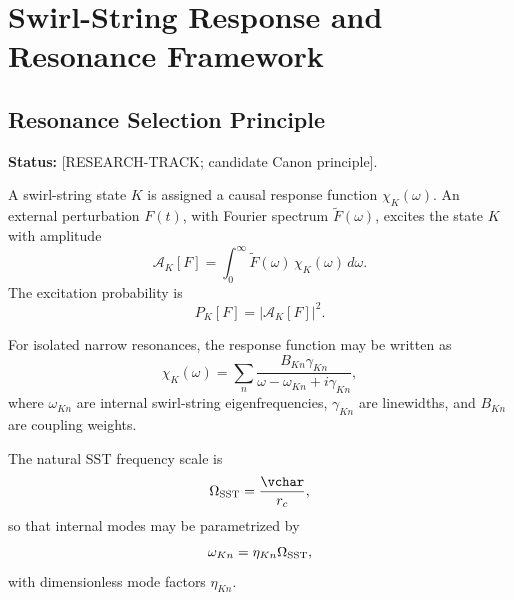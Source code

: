 \providecommand{\vswirl}{\mathbf{v}_{\!\boldsymbol{\circlearrowleft}}}
\providecommand{\vnorm}{\lVert \mathbf{v}_{\!\boldsymbol{\circlearrowleft}}\rVert}
\providecommand{\rhoF}{\rho_{\!f}}
\providecommand{\rhoE}{\rho_{\!E}}
\providecommand{\rhoM}{\rho_{\!m}}
\providecommand{\rhocore}{\rho_{\text{core}}}
\providecommand{\rc}{r_c}
\providecommand{\omC}{\omega_C}
\providecommand{\Fswirlmax}{F_{\text{swirl}}^{\max}}


\section{Swirl-String Response and Resonance Framework}

\subsection{Resonance Selection Principle}
    \label{sec:resonance-selection-principle}
    
    \noindent
    \textbf{Status:} [RESEARCH-TRACK; candidate Canon principle].
    
    A swirl-string state \(K\) is assigned a causal response function
    \(\chi_K(\omega)\). An external perturbation \(F(t)\), with Fourier
    spectrum \(\widetilde F(\omega)\), excites the state \(K\) with amplitude
    \begin{equation}
        \mathcal A_K[F]
        =
        \int_0^\infty
        \widetilde F(\omega)\,
        \chi_K(\omega)\,
        d\omega .
    \end{equation}
    The excitation probability is
    \begin{equation}
        P_K[F]
        =
        |\mathcal A_K[F]|^2 .
    \end{equation}
    
    For isolated narrow resonances, the response function may be written as
    \begin{equation}
        \chi_K(\omega)
        =
        \sum_n
        \frac{B_{Kn}\gamma_{Kn}}
        {\omega-\omega_{Kn}+i\gamma_{Kn}},
    \end{equation}
    where \(\omega_{Kn}\) are internal swirl-string eigenfrequencies,
    \(\gamma_{Kn}\) are linewidths, and \(B_{Kn}\) are coupling weights.
    
    The natural SST frequency scale is
    \begin{equation}
        \Omega_{\rm SST}
        =
        \frac{\vchar}{r_c},
    \end{equation}
    so that internal modes may be parametrized by
    \begin{equation}
        \omega_{Kn}
        =
        \eta_{Kn}\Omega_{\rm SST},
    \end{equation}
    with dimensionless mode factors \(\eta_{Kn}\).
    
